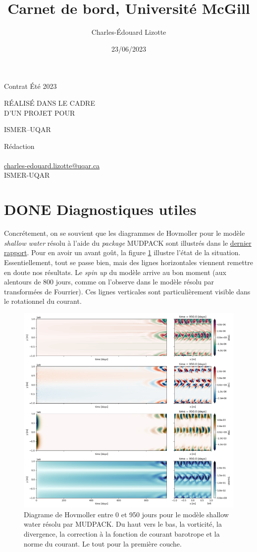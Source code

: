 \documentclass[10pt]{article}
\author{Charles-Édouard Lizotte}
\date{23/06/2023}
\title{Carnet de bord, Université McGill}
\makeatletter
\numberwithin{equation}{section}
\newcommand{\mytitlepage}{
\begin{titlepage}
\begin{center}
{\Large Contrat Été 2023 \par}
\vspace{2cm}
{\Large \MakeUppercase{\thetitle} \par}
\vspace{2cm}
RÉALISÉ DANS LE CADRE\\ D'UN PROJET POUR \par
\vspace{2cm}
{\Large ISMER--UQAR \par}
\vspace{2cm}
{\thedate}
\end{center}
\vfill
Rédaction \\
{\theauthor}\\
\url{charles-edouard.lizotte@uqar.ca}\\
ISMER-UQAR
\end{titlepage}
}
\makeatother
\begin{document}
\mytitlepage
\tableofcontents\newpage



\section{{\bfseries\sffamily DONE} Diagnostiques utiles}
\label{sec:org41cc5a0}

Concrétement, on se souvient que les diagrammes de Hovmoller pour le modèle \emph{shallow water} résolu à l'aide du \emph{package} MUDPACK sont illustrés dans le \href{rapport-2023-06-16.org}{dernier rapport}.
Pour en avoir un avant goût, la figure \ref{fig:org5952d96} illustre l'état de la situation.
Essentiellement, tout se passe bien, mais des lignes horizontales viennent remettre en doute nos résultats.
Le \emph{spin up} du modèle arrive au bon moment (aux alentours de 800 jours, comme on l'observe dans le modèle résolu par transformées de Fourrier).
Ces lignes verticales sont particulièrement visible dans le rotationnel du courant. 

\begin{figure}[htbp]
\centering
\includegraphics[width=.9\linewidth]{figures/tests/2023-06-21_hovmoller1_t=950days.png}
\caption{\label{fig:org5952d96}Diagrame de Hovmoller entre 0 et 950 jours pour le modèle shallow water résolu par MUDPACK. Du haut vers le bas, la vorticité, la divergence, la correction à la fonction de courant barotrope et la norme du courant. Le tout pour la première couche.}
\end{figure}
\end{document}
